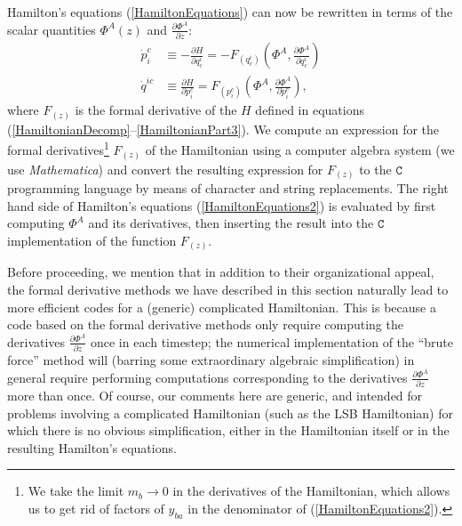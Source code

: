\documentclass[aps,onecolumn,notitlepage,eqsecnum,nofootinbib,floatfix,superscriptaddress]{revtex4-1}
\begin{document}
\noindent Hamilton's equations (\ref{HamiltonEquations}) can now be rewritten in terms of the scalar quantities $\Phi^{A}(z)$ and $\frac{\partial \Phi^{A}}{\partial z}$:
\begin{equation} \label{HamiltonEquations2}
\begin{aligned}
  \dot{p}_i^c&\equiv -\frac{\partial H}{\partial q^i_c}= -F_{(q^i_c)}\left(\Phi^{A},\frac{\partial \Phi^{A}}{\partial q^i_c}\right) \\
  \dot{q}^{ic}&\equiv \frac{\partial H}{\partial p_i^c}= F_{(p_i^c)}\left(\Phi^{A},\frac{\partial \Phi^{A}}{\partial p_i^c}\right),
\end{aligned}
\end{equation}
where $F_{(z)}$ is the formal derivative of the $H$ defined in equations (\ref{HamiltonianDecomp}--\ref{HamiltonianPart3}). We compute an expression for the formal derivatives\footnote{We take the limit $m_b \rightarrow 0$ in the derivatives of the Hamiltonian, which allows us to get rid of factors of $y_{ba}$ in the denominator of (\ref{HamiltonEquations2}).} $F_{(z)}$ of the Hamiltonian using a computer algebra system (we use \textit{Mathematica}) and convert the resulting expression for $F_{(z)}$ to the $\mathtt{C}$ programming language by means of character and string replacements. The right hand side of Hamilton's equations (\ref{HamiltonEquations2}) is evaluated by first computing $\Phi^A$ and its derivatives, then inserting the result into the $\mathtt{C}$ implementation of the function $F_{(z)}$.

Before proceeding, we mention that in addition to their organizational appeal, the formal derivative methods we have described in this section naturally lead to more efficient codes for a (generic) complicated Hamiltonian. This is because a code based on the formal derivative methods only require computing the derivatives $\frac{\partial \Phi^{A}}{\partial z}$ once in each timestep; the numerical implementation of the ``brute force'' method will (barring some extraordinary algebraic simplification) in general require performing computations corresponding to the derivatives $\frac{\partial \Phi^{A}}{\partial z}$ more than once. Of course, our comments here are generic, and intended for problems involving a complicated Hamiltonian (such as the LSB Hamiltonian) for which there is no obvious simplification, either in the Hamiltonian itself or in the resulting Hamilton's equations.

\end{document}
